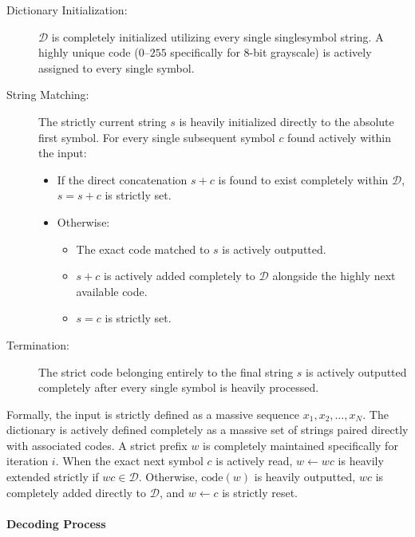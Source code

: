 \begin{description}
    \item[Dictionary Initialization:] $\mathcal{D}$ is completely initialized utilizing every single singlesymbol string. A highly unique code ($0$--$255$ specifically for 8-bit grayscale) is actively assigned to every single symbol.
    \item[String Matching:] The strictly current string $s$ is heavily initialized directly to the absolute first symbol. For every single subsequent symbol $c$ found actively within the input:
    \begin{itemize}
        \item If the direct concatenation $s + c$ is found to exist completely within $\mathcal{D}$, $s = s + c$ is strictly set.
        \item Otherwise:
        \begin{itemize}
            \item The exact code matched to $s$ is actively outputted.
            \item $s + c$ is actively added completely to $\mathcal{D}$ alongside the highly next available code.
            \item $s = c$ is strictly set.
        \end{itemize}
    \end{itemize}
    \item[Termination:] The strict code belonging entirely to the final string $s$ is actively outputted completely after every single symbol is heavily processed.
\end{description}

Formally, the input is strictly defined as a massive sequence $x_1, x_2, \dots, x_N$. The dictionary is actively defined completely as a massive set of strings paired directly with associated codes. A strict prefix $w$ is completely maintained specifically for iteration $i$. When the exact next symbol $c$ is actively read, $w \leftarrow wc$ is heavily extended strictly if $wc \in \mathcal{D}$. Otherwise, $\text{code}(w)$ is heavily outputted, $wc$ is completely added directly to $\mathcal{D}$, and $w \leftarrow c$ is strictly reset.

\paragraph{Decoding Process}\mbox{}\\

